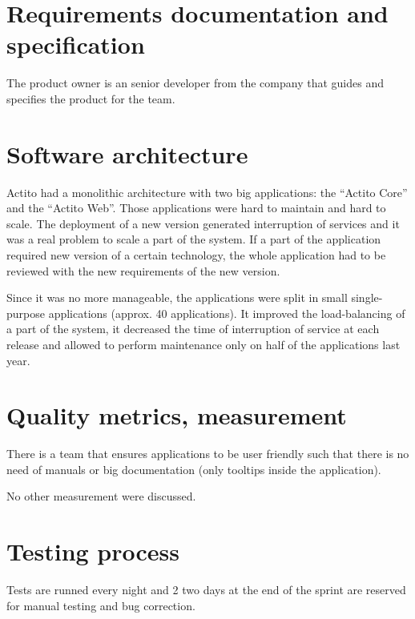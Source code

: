 \documentclass[a4paper, 11pt]{article}
\begin{document}
    \section{Requirements documentation and specification}

    The product owner is an senior developer from the company that guides and
    specifies the product for the team.

    \section{Software architecture}

    Actito had a monolithic architecture with two big applications: the
    \enquote{Actito Core} and the \enquote{Actito Web}. Those applications were
    hard to maintain and hard to scale. The deployment of a new version generated
    interruption of services and it was a real problem to scale a part of the
    system. If a part of the application required new version of a certain
    technology, the whole application had to be reviewed with the new requirements
    of the new version. \newline

    Since it was no more manageable, the applications were split in small
    single-purpose applications (approx. 40 applications). It improved the
    load-balancing of a part of the system, it decreased the time of interruption
    of service at each release and allowed to perform maintenance only on half
    of the applications last year.

    \section{Quality metrics, measurement}

    There is a team that ensures applications to be user friendly such that
    there is no need of manuals or big documentation (only tooltips inside
    the application). \newline

    No other measurement were discussed.

    \section{Testing process}

    Tests are runned every night and 2 two days at the end of the sprint are
    reserved for manual testing and bug correction.
\end{document}
